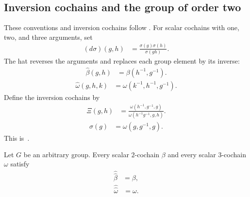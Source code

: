 \subsection{Inversion cochains and the group of order two}

\begin{definition}
    \label{def:mpug_inversion_cochains}
    \leanok
    These conventions and inversion cochains follow
    \cite[lines~5910--5916 and 5967--5973]{FrancoRubio2025MPUGauging}.
    For scalar cochains with one, two, and three arguments, set
    \begin{align}
        (d\sigma)(g,h) & =\frac{\sigma(g)\sigma(h)}{\sigma(gh)}.
        \label{eq:mpug_one_coboundary}
    \end{align}
    The hat reverses the arguments and replaces each group element by its
    inverse:
    \begin{align}
        \widehat\beta(g,h) & =\beta(h^{-1},g^{-1}).
        \label{eq:mpug_two_hat}
    \end{align}
    \begin{align}
        \widehat\omega(g,h,k) & =\omega(k^{-1},h^{-1},g^{-1}).
        \label{eq:mpug_three_hat}
    \end{align}
    Define the inversion cochains by
    \begin{align}
        \Xi(g,h) & =
        \frac{\omega(h^{-1},g^{-1},g)}
        {\omega(h^{-1}g^{-1},g,h)}.
        \label{eq:mpug_intro_Xi}
    \end{align}
    \begin{align}
        \sigma(g) & =\omega(g,g^{-1},g).
        \label{eq:mpug_intro_sigma}
    \end{align}
    This is~\cite[``Inversion cochains'']{QICLean2026Blueprint}.
\end{definition}

\begin{lemma}
    \label{thm:mpug_scalar_hat_involution}
    \leanok
    Let $G$ be an arbitrary group. Every scalar $2$-cochain $\beta$ and every
    scalar $3$-cochain $\omega$ satisfy
    \begin{align}
        \widehat{\widehat\beta} & =\beta,
        \label{eq:mpug_two_hat_hat}
    \end{align}
    \begin{align}
        \widehat{\widehat\omega} & =\omega.
        \label{eq:mpug_three_hat_hat}
    \end{align}
\end{lemma}


